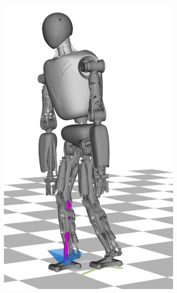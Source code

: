 \begin{figure}
\begin{subfigure}{.16\textwidth}
	\includegraphics[width=1\linewidth]{fig/walkDynamic/snaps/6}
	\caption{}
\end{subfigure}%
\begin{subfigure}{.16\textwidth}

\end{subfigure}
\end{figure}
